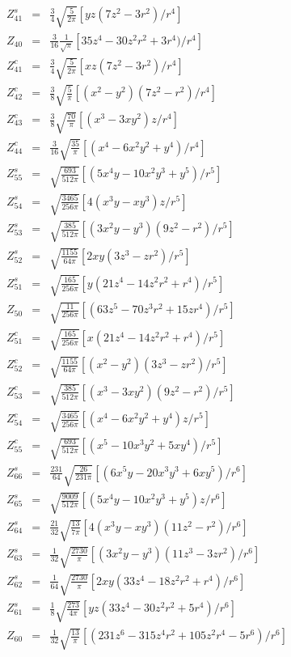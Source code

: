\documentclass[twoside]{article}
\begin{document}
{\begin{eqnarray*}
Z^s_{41}&=&\frac{3}{4}\sqrt{\frac{5}{2\pi}}[yz(7z^2-3r^2)/r^4] \\
Z_{40}&=&\frac{3}{16}\frac{1}{\sqrt{\pi}}[35z^4-30z^2r^2+3r^4)/r^4] \\
Z^c_{41}&=&\frac{3}{4}\sqrt{\frac{5}{2\pi}}[xz(7z^2-3r^2)/r^4] \\
Z^c_{42}&=&\frac{3}{8}\sqrt{\frac{5}{\pi}}[(x^2-y^2)(7z^2-r^2)/r^4] \\
Z^c_{43}&=&\frac{3}{8}\sqrt{\frac{70}{\pi}}[(x^3-3xy^2)z/r^4] \\
Z^c_{44}&=&\frac{3}{16}\sqrt{\frac{35}{\pi}}[(x^4-6x^2y^2+y^4)/r^4] \\
\hline
Z^s_{55}&=&\sqrt{\frac{693}{512\pi}}[(5x^4y-10x^2y^3+y^5)/r^5] \\
Z^s_{54}&=&\sqrt{\frac{3465}{256\pi}}[4(x^3y-xy^3)z/r^5] \\
Z^s_{53}&=&\sqrt{\frac{385}{512\pi}}[(3x^2y-y^3)(9z^2-r^2)/r^5] \\
Z^s_{52}&=&\sqrt{\frac{1155}{64\pi}}[2xy(3z^3-zr^2)/r^5] \\
Z^s_{51}&=&\sqrt{\frac{165}{256\pi}}[y(21z^4-14z^2r^2+r^4)/r^5] \\
Z_{50}&=&\sqrt{\frac{11}{256\pi}}[(63z^5-70z^3r^2+15zr^4)/r^5] \\
Z^c_{51}&=&\sqrt{\frac{165}{256\pi}}[x(21z^4-14z^2r^2+r^4)/r^5] \\
Z^c_{52}&=&\sqrt{\frac{1155}{64\pi}}[(x^2-y^2)(3z^3-zr^2)/r^5] \\
Z^c_{53}&=&\sqrt{\frac{385}{512\pi}}[(x^3-3xy^2)(9z^2-r^2)/r^5] \\
Z^c_{54}&=&\sqrt{\frac{3465}{256\pi}}[(x^4-6x^2y^2+y^4)z/r^5] \\
Z^c_{55}&=&\sqrt{\frac{693}{512\pi}}[(x^5-10x^3y^2+5xy^4)/r^5] \\
\hline
Z^s_{66}&=&\frac{231}{64}\sqrt{\frac{26}{231\pi}}[(6x^5y-20x^3y^3+6xy^5)/r^6] \\
Z^s_{65}&=&\sqrt{\frac{9009}{512\pi}}[(5x^4y-10x^2y^3+y^5)z/r^6] \\
Z^s_{64}&=&\frac{21}{32}\sqrt{\frac{13}{7\pi}}[4(x^3y-xy^3)(11z^2-r^2)/r^6] \\
Z^s_{63}&=&\frac{1}{32}\sqrt{\frac{2730}{\pi}}[(3x^2y-y^3)(11z^3-3zr^2)/r^6] \\
Z^s_{62}&=&\frac{1}{64}\sqrt{\frac{2730}{\pi}}[2xy(33z^4-18z^2r^2+r^4)/r^6] \\
Z^s_{61}&=&\frac{1}{8}\sqrt{\frac{273}{4\pi}}[yz(33z^4-30z^2r^2+5r^4)/r^6] \\
Z_{60}&=&\frac{1}{32}\sqrt{\frac{13}{\pi}}[(231z^6-315z^4r^2+105z^2r^4-5r^6)/r^6] \\

\end{eqnarray*}}
\end{document}

